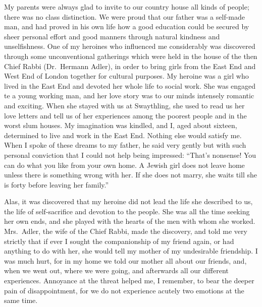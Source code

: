 My parents were always glad to invite to our country
house all kinds of people; there was no class distinction.
We were proud that our father was a self-made man, and
had proved in his own life how a good education could be
secured by sheer personal effort and good manners
through natural kindness and unselfishness. One of my
heroines who influenced me considerably was discovered
through some unconventional gatherings which were held
in the house of the then Chief Rabbi (Dr.\ Hermann
Adler), in order to bring girls from the East End and
West End of London together for cultural purposes. My
heroine was a girl who lived in the East End and devoted
her whole life to social work. She was engaged te a young
working man, and her love story was to our minds
intensely romantic and exciting. When she stayed with
us at Swaythling, she used to read us her love letters and
tell us of her experiences among the poorest people and
in the worst slum houses. My imagination was kindled,
and I, aged about sixteen, determined to live and work
in the East End. Nothing else would satisfy me. When
I spoke of these dreams to my father, he said very gently
but with such personal conviction that I could not help
being impressed: “That’s nonsense! You can do what
you like from your own home. A Jewish girl does not
leave home unless there is something wrong with her. If
she does not marry, she waits till she is forty before leaving
her family.”

Alas, it was discovered that my heroine did not lead the
life she described to us, the life of self-sacrifice and devotion
to the people. She was all the time seeking her own
ends, and she played with the hearts of the men with
whom she worked. Mrs.\ Adler, the wife of the Chief
Rabbi, made the discovery, and told me very strictly that
if ever I sought the companionship of my friend again, or
had anything to do with her, she would tell my mother
of my undesirable friendship. I was much hurt, for in
my home we told our mother all about our friends, and,
when we went out, where we were going, and afterwards
all our different experiences. Annoyance at the threat
helped me, I remember, to bear the deeper pain of
disappointment, for we do not experience acutely two
emotions at the same time.

